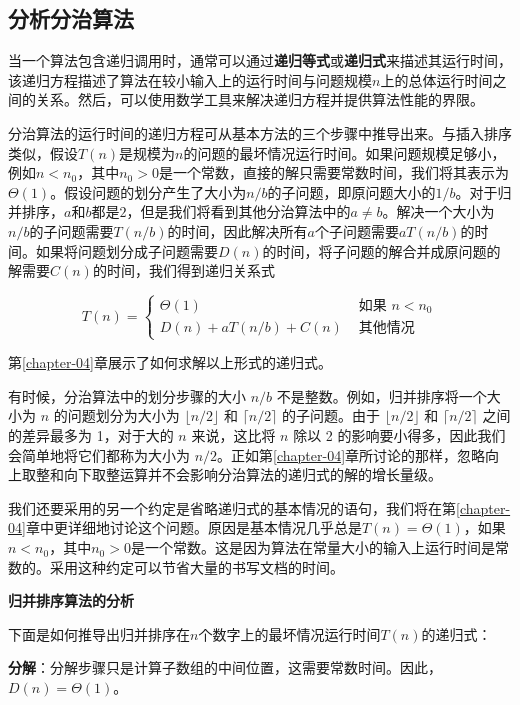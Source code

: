 \documentclass[lang=cn,newtx,10pt,scheme=chinese]{elegantbook}
\begin{document}
\subsection{分析分治算法}\label{subsection-2.3.2}

当一个算法包含递归调用时，通常可以通过\textbf{递归等式}或\textbf{递归式}来描述其运行时间，该递归方程描述了算法在较小输入上的运行时间与问题规模$n$上的总体运行时间之间的关系。然后，可以使用数学工具来解决递归方程并提供算法性能的界限。

分治算法的运行时间的递归方程可从基本方法的三个步骤中推导出来。与插入排序类似，假设$T(n)$是规模为$n$的问题的最坏情况运行时间。如果问题规模足够小，例如$n < n_0$，其中$n_0 > 0$是一个常数，直接的解只需要常数时间，我们将其表示为$\Theta(1)$。假设问题的划分产生了大小为$n/b$的子问题，即原问题大小的$1/b$。对于归并排序，$a$和$b$都是$2$，但是我们将看到其他分治算法中的$a\neq b$。解决一个大小为$n/b$的子问题需要$T(n/b)$的时间，因此解决所有$a$个子问题需要$aT(n/b)$的时间。如果将问题划分成子问题需要$D(n)$的时间，将子问题的解合并成原问题的解需要$C(n)$的时间，我们得到递归关系式

$$
T(n)= \begin{cases}\Theta(1) & \text { 如果 } n<n_0 \\ D(n)+a T(n / b)+C(n) & \text { 其他情况 }\end{cases}
$$

第\ref{chapter-04}章展示了如何求解以上形式的递归式。

有时候，分治算法中的划分步骤的大小 $n/b$ 不是整数。例如，归并排序将一个大小为 $n$ 的问题划分为大小为 $\lfloor{n/2}\rfloor$ 和 $\lceil{n/2}\rceil$ 的子问题。由于 $\lfloor{n/2}\rfloor$ 和 $\lceil{n/2}\rceil$ 之间的差异最多为 1，对于大的 $n$ 来说，这比将 $n$ 除以 2 的影响要小得多，因此我们会简单地将它们都称为大小为 $n/2$。正如第\ref{chapter-04}章所讨论的那样，忽略向上取整和向下取整运算并不会影响分治算法的递归式的解的增长量级。

我们还要采用的另一个约定是省略递归式的基本情况的语句，我们将在第\ref{chapter-04}章中更详细地讨论这个问题。原因是基本情况几乎总是$T(n)=\Theta(1)$，如果$n < n_0$，其中$n_0 > 0$是一个常数。这是因为算法在常量大小的输入上运行时间是常数的。采用这种约定可以节省大量的书写文档的时间。

\textbf{归并排序算法的分析}

下面是如何推导出归并排序在$n$个数字上的最坏情况运行时间$T(n)$的递归式：

\textbf{分解}：分解步骤只是计算子数组的中间位置，这需要常数时间。因此，$D(n)=\Theta(1)$。
\end{document}
